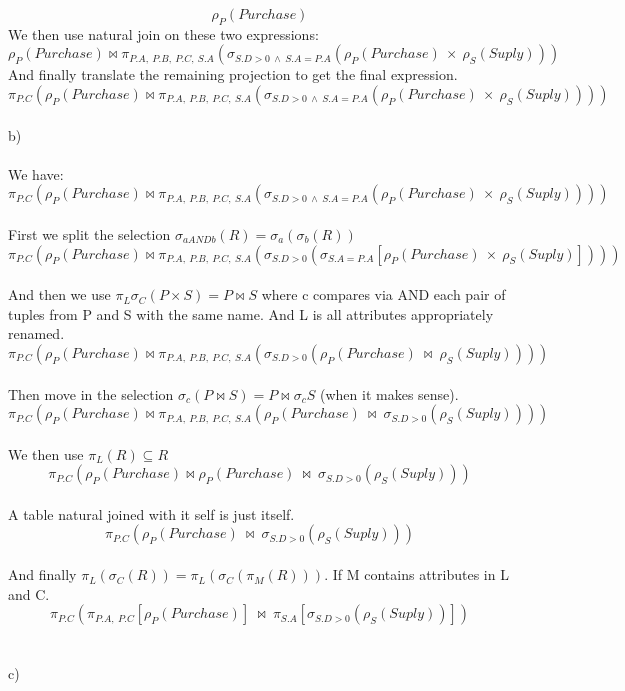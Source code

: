 \documentclass[12pt, letterpaper, twoside]{article}
\begin{document}
$$
\rho_P(Purchase)
$$
We then use natural join on these two expressions:
$$
\rho_P(Purchase) \bowtie
\pi_{P.A,\ P.B,\ P.C,\ S.A}(\sigma_{S.D > 0\ \wedge\ S.A = P.A}(\rho_P(Purchase)\ \times\ \rho_S(Suply)))
$$
And finally translate the remaining projection to get the final expression.
$$
\pi_{P.C}(\rho_P(Purchase) \bowtie
\pi_{P.A,\ P.B,\ P.C,\ S.A}(\sigma_{S.D > 0\ \wedge\ S.A = P.A}(\rho_P(Purchase)\ \times\ \rho_S(Suply))))
$$
\\
b)\\
\\
We have:\\
$$
\pi_{P.C}(\rho_P(Purchase) \bowtie
\pi_{P.A,\ P.B,\ P.C,\ S.A}(\sigma_{S.D > 0\ \wedge\ S.A = P.A}(\rho_P(Purchase)\ \times\ \rho_S(Suply))))
$$
\\
First we split the selection $\sigma_{a AND b}(R) = \sigma_a(\sigma_b(R))$\\
$$
\pi_{P.C}(\rho_P(Purchase) \bowtie
\pi_{P.A,\ P.B,\ P.C,\ S.A}(\sigma_{S.D > 0}(\sigma_{S.A = P.A}[\rho_P(Purchase)\ \times\ \rho_S(Suply)])))
$$
\\
And then we use $\pi_L\sigma_C(P \times S) = P \bowtie S$ where c compares via AND each pair of tuples from P and S with the same name. And L is all attributes appropriately renamed.\\
$$
\pi_{P.C}(\rho_P(Purchase) \bowtie
\pi_{P.A,\ P.B,\ P.C,\ S.A}(\sigma_{S.D > 0}(\rho_P(Purchase)\ \bowtie\ \rho_S(Suply))))
$$
\\
Then move in the selection $\sigma_c(P \bowtie S) = P \bowtie \sigma_cS$ (when it makes sense).\\
$$
\pi_{P.C}(\rho_P(Purchase) \bowtie
\pi_{P.A,\ P.B,\ P.C,\ S.A}(\rho_P(Purchase)\ \bowtie\ \sigma_{S.D > 0}(\rho_S(Suply))))
$$
\\
We then use $\pi_L(R) \subseteq R$\\
$$
\pi_{P.C}(\rho_P(Purchase) \bowtie
\rho_P(Purchase)\ \bowtie\ \sigma_{S.D > 0}(\rho_S(Suply)))
$$
\\
A table natural joined with it self is just itself.
$$
\pi_{P.C}(
\rho_P(Purchase)\ \bowtie\ \sigma_{S.D > 0}(\rho_S(Suply)))
$$
\\
And finally $\pi_L(\sigma_C(R)) = \pi_L(\sigma_C(\pi_M(R)))$. If M contains attributes in L and C.\\
 $$
\pi_{P.C}(
\pi_{P.A,\ P.C}[\rho_P(Purchase)]\ \bowtie\ \pi_{S.A}[\sigma_{S.D > 0}(\rho_S(Suply))])
$$
\\
\newpage
\ \\
c)\\
\end{document}
